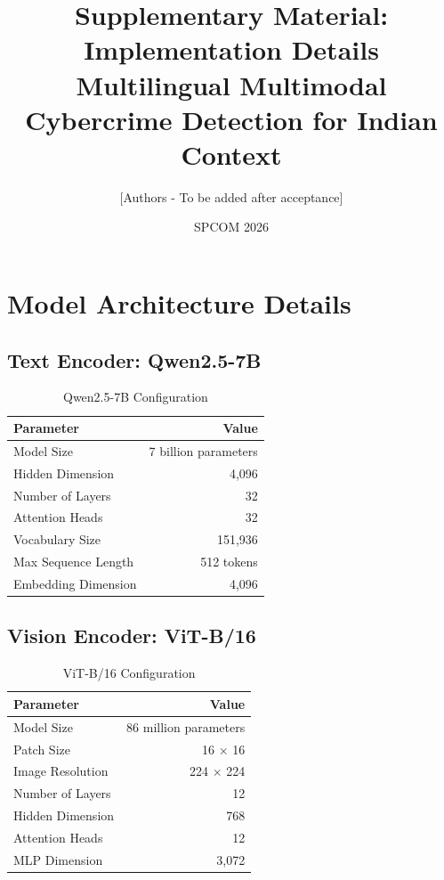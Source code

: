 \documentclass[10pt,a4paper]{article}
\title{Supplementary Material: Implementation Details\\
\large Multilingual Multimodal Cybercrime Detection for Indian Context}
\author{[Authors - To be added after acceptance]}
\date{SPCOM 2026}
\begin{document}
\maketitle

\section{Model Architecture Details}

\subsection{Text Encoder: Qwen2.5-7B}

\begin{table}[h]
\centering
\caption{Qwen2.5-7B Configuration}
\begin{tabular}{lr}
\toprule
\rowcolor{headerblue}
\textbf{Parameter} & \textbf{Value} \\
\midrule
Model Size              & 7 billion parameters \\
Hidden Dimension        & 4,096 \\
Number of Layers        & 32 \\
Attention Heads         & 32 \\
Vocabulary Size         & 151,936 \\
Max Sequence Length     & 512 tokens \\
Embedding Dimension     & 4,096 \\
\bottomrule
\end{tabular}
\end{table}

\subsection{Vision Encoder: ViT-B/16}

\begin{table}[h]
\centering
\caption{ViT-B/16 Configuration}
\begin{tabular}{lr}
\toprule
\rowcolor{headerblue}
\textbf{Parameter} & \textbf{Value} \\
\midrule
Model Size              & 86 million parameters \\
Patch Size              & 16 $\times$ 16 \\
Image Resolution        & 224 $\times$ 224 \\
Number of Layers        & 12 \\
Hidden Dimension        & 768 \\
Attention Heads         & 12 \\
MLP Dimension           & 3,072 \\
\bottomrule
\end{tabular}
\end{table}
\end{document}

